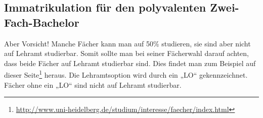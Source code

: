 %
%
%
%
%
%

\subsection{Immatrikulation für den polyvalenten Zwei-Fach-Bachelor}
Aber Vorsicht! Manche Fächer kann man auf 50\% studieren, sie sind aber nicht auf Lehramt studierbar. Somit sollte man bei seiner Fächerwahl darauf achten, dass beide Fächer auf Lehramt studierbar sind. Dies findet man zum Beispiel auf dieser Seite\footnote{\url{http://www.uni-heidelberg.de/studium/interesse/faecher/index.html}} heraus. Die Lehramtsoption wird durch ein „LO“ gekennzeichnet. Fächer ohne ein „LO“ sind nicht auf Lehramt studierbar.


